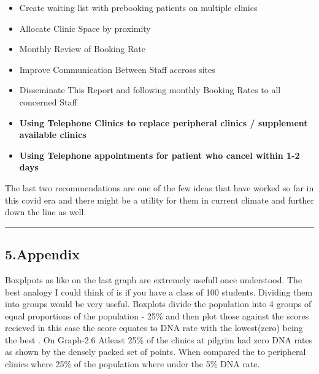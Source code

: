 \documentclass[]{article}
\providecommand{\tightlist}{%
  \setlength{\itemsep}{0pt}\setlength{\parskip}{0pt}}
\begin{document}
\begin{itemize}
\tightlist
\item
  Create waiting list with prebooking patients on multiple clinics
\item
  Allocate Clinic Space by proximity\\
\item
  Monthly Review of Booking Rate\\
\item
  Improve Communication Between Staff accross sites\\
\item
  Disseminate This Report and following monthly Booking Rates to all
  concerned Staff\\
\item
  \textbf{Using Telephone Clinics to replace peripheral clinics /
  supplement available clinics}
\item
  \textbf{Using Telephone appointments for patient who cancel within 1-2
  days}
\end{itemize}

The last two recommendations are one of the few ideas that have worked
so far in this covid era and there might be a utility for them in
current climate and further down the line as well.

\begin{center}\rule{0.5\linewidth}{0.5pt}\end{center}

\newpage

\hypertarget{appendix}{%
\subsection{5.Appendix}\label{appendix}}

Boxplpots as like on the last graph are extremely usefull once
understood. The best analogy I could think of is if you have a class of
100 students. Dividing them into groups would be very useful. Boxplots
divide the population into 4 groups of equal proportions of the
population - 25\% and then plot those against the scores recieved in
this case the score equates to DNA rate with the lowest(zero) being the
best . On Graph-2.6 Atleast 25\% of the clinics at pilgrim had zero DNA
rates as shown by the densely packed set of points. When compared the to
peripheral clinics where 25\% of the population where under the 5\% DNA
rate.
\end{document}
